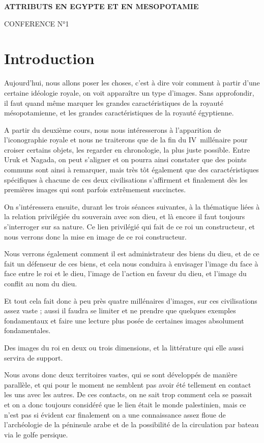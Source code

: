 \documentclass[a4paper,10pt]{article}
\title{}
\author{Florence}
\date{2012-07-11}
\begin{document}
\textbf{ATTRIBUTS EN EGYPTE ET EN MESOPOTAMIE}

CONFERENCE N°1  


\section{Introduction}

Aujourd'hui, nous allons poser les choses, c'est à dire voir comment 
à partir d'une certaine idéologie royale, on voit apparaître un type 
d'images. Sans approfondir,  il faut quand même marquer les grandes 
caractéristiques de la royauté mésopotamienne, et les grandes 
caractéristiques de la royauté égyptienne.

A partir du deuxième cours, nous nous intéresserons à l'apparition de 
l'iconographie royale et nous ne traiterons que de la fin du 
IV\ieme~millénaire pour croiser certains objets, les regarder en 
chronologie, la plus juste possible.
Entre Uruk et Nagada, on peut s'aligner et on pourra ainsi constater 
que des points communs sont ainsi à remarquer, mais très tôt également 
que des caractéristiques spécifiques à chacune de ces deux 
civilisations s'affirment et finalement dès les premières images qui 
sont parfois extrêmement succinctes.

On s'intéressera ensuite, durant les trois séances suivantes, à la 
thématique liées à la relation privilégiée du souverain avec son dieu, 
et là encore il faut toujours s'interroger sur sa nature. Ce lien 
privilégié qui fait de ce roi un constructeur, et nous verrons donc 
la mise en image de ce roi constructeur.

Nous verrons également comment il est administrateur des biens du 
dieu, et de ce fait un défenseur de ces biens, et cela nous conduira 
à envisager l'image du face à face entre le roi et le dieu, l'image 
de l'action en faveur du dieu, et l'image du conflit au nom du dieu.

Et tout cela fait donc à peu près quatre millénaires d'images, sur 
ces civilisations assez vaste ; aussi il faudra se limiter et ne 
prendre que quelques exemples fondamentaux et faire une lecture plus 
posée de certaines images absolument fondamentales. 

Des images du roi en deux ou trois dimensions, et la littérature qui 
elle aussi servira de support.

Nous avons donc deux territoires vastes, qui se sont développés de 
manière parallèle, et qui pour le moment ne semblent pas avoir été 
tellement en contact les uns avec les autres. De ces contacts, on ne 
sait trop comment cela se passait et on a donc toujours considéré que 
le lien était le monde palestinien, mais ce n'est pas si évident car 
finalement on a une connaissance assez floue de l'archéologie de la 
péninsule arabe et de la possibilité de la circulation par bateau 
via le golfe persique.
\end{document}
